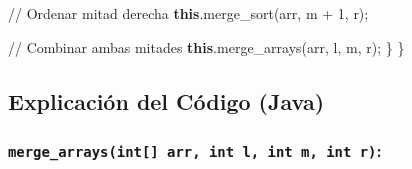 \documentclass[
  spanish,
  letterpaper,
  DIV=11,
  numbers=noendperiod]{scrreprt}
\newenvironment{Shaded}{\begin{snugshade}}{\end{snugshade}}
\newcommand{\CommentTok}[1]{\textcolor[rgb]{0.37,0.37,0.37}{#1}}
\newcommand{\DecValTok}[1]{\textcolor[rgb]{0.68,0.00,0.00}{#1}}
\newcommand{\FunctionTok}[1]{\textcolor[rgb]{0.28,0.35,0.67}{#1}}
\newcommand{\KeywordTok}[1]{\textcolor[rgb]{0.00,0.23,0.31}{\textbf{#1}}}
\newcommand{\NormalTok}[1]{\textcolor[rgb]{0.00,0.23,0.31}{#1}}
\newcommand{\OperatorTok}[1]{\textcolor[rgb]{0.37,0.37,0.37}{#1}}
\begin{document}
\begin{Shaded}
\begin{Highlighting}[]
            \CommentTok{// Ordenar mitad derecha}
            \KeywordTok{this}\OperatorTok{.}\FunctionTok{merge\_sort}\NormalTok{(arr}\OperatorTok{,}\NormalTok{ m }\OperatorTok{+} \DecValTok{1}\OperatorTok{,}\NormalTok{ r)}\OperatorTok{;}

            \CommentTok{// Combinar ambas mitades}
            \KeywordTok{this}\OperatorTok{.}\FunctionTok{merge\_arrays}\NormalTok{(arr}\OperatorTok{,}\NormalTok{ l}\OperatorTok{,}\NormalTok{ m}\OperatorTok{,}\NormalTok{ r)}\OperatorTok{;}
\NormalTok{        \}}
\NormalTok{    \}}
\end{Highlighting}
\end{Shaded}

\subsection{Explicación del Código
(Java)}\label{explicaciuxf3n-del-cuxf3digo-java-1}

\subsubsection{\texorpdfstring{\texttt{merge\_arrays(int{[}{]}\ arr,\ int\ l,\ int\ m,\ int\ r)}:}{merge\_arrays(int{[}{]} arr, int l, int m, int r):}}\label{merge_arraysint-arr-int-l-int-m-int-r}
\end{document}

